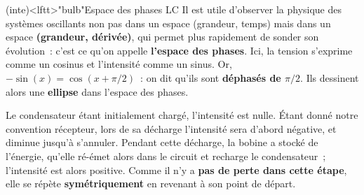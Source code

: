 \documentclass[../../main/main.tex]{subfiles}
\begin{document}
\begin{tcb}(inte)<lftt>"bulb"{Espace des phases LC}
	Il est utile d'observer la physique des systèmes oscillants non pas dans un
	espace (grandeur, temps) mais dans un espace \textbf{(grandeur,
		dérivée)}, qui permet plus rapidement de sonder son évolution~: c'est ce
	qu'on appelle \textbf{l'espace des phases}.
	\bigbreak
	Ici, la tension s'exprime comme un cosinus et l'intensité comme un sinus. Or,
	$-\sin(x) = \cos(x+\pi/2)$~: on dit qu'ils sont \textbf{déphasés de $\pi/2$}.
	Ils dessinent alors une \textbf{ellipse} dans l'espace des phases.
	\tcblower
	\begin{isd}[righthand ratio=.3]
		Le condensateur étant initialement chargé, l'intensité est nulle. Étant donné
		notre convention récepteur, lors de sa décharge l'intensité sera d'abord
		négative, et diminue jusqu'à s'annuler.
		\bigbreak
		Pendant cette décharge, la bobine a stocké de l'énergie, qu'elle ré-émet alors
		dans le circuit et recharge le condensateur~; l'intensité est alors positive.
		\bigbreak
		Comme il n'y a \textbf{pas de perte dans cette étape}, elle se répète
		\textbf{symétriquement} en revenant à son point de départ.
		\tcblower
		\begin{center}
\end{center}
\end{isd}
\end{tcb}
\end{document}

